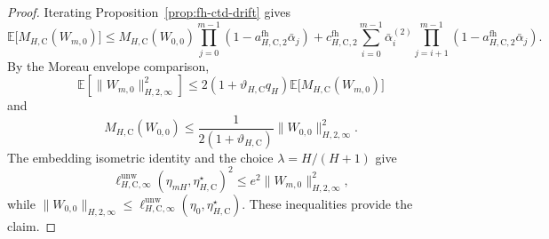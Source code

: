 \documentclass{article}
\newcommand{\E}{\mathbb{E}}
\begin{document}
\begin{proof}
Iterating Proposition~\ref{prop:fh-ctd-drift} gives
\begin{equation}
\E\bigl[M_{H, \mathrm C}(W_{m, 0}) \bigr] \le M_{H, \mathrm C}(W_{0, 0}) \prod_{j=0}^{m-1}(1- a^{\mathrm{fh}}_{H, \mathrm C,2}\bar\alpha_j) + c^{\mathrm{fh}}_{H, \mathrm C,2}\sum_{i=0}^{m-1}\bar\alpha^{(2)}_i \prod_{j=i+1}^{m-1}(1- a^{\mathrm{fh}}_{H, \mathrm C,2} \bar\alpha_j).
\end{equation}
By the Moreau envelope comparison,
\begin{equation}
\E[\lVert W_{m, 0}\rVert^2_{H, 2, \infty}] \le 2(1+\vartheta_{H, \mathrm C}q_H)\E\bigl[ M_{H, \mathrm C}(W_{m, 0})\bigr]
\end{equation}
and
\begin{equation}
M_{H, \mathrm C}(W_{0, 0}) \le \frac{1}{2(1+\vartheta_{H, \mathrm C})}\lVert W_{0, 0}\rVert^2_{H, 2, \infty}.
\end{equation}
The embedding isometric identity and the choice $\lambda=H/(H+1)$ give
\begin{equation}
\ell_{H,\mathrm C,\infty}^{\mathrm{unw}}(\eta_{mH},\eta_{H,\mathrm C}^\star)^2\le e^2\lVert W_{m,0}\rVert_{H,2,\infty}^2,
\end{equation}
while $\lVert W_{0,0}\rVert_{H,2,\infty}\le\ell_{H,\mathrm C,\infty}^{\mathrm{unw}}(\eta_0,\eta_{H,\mathrm C}^\star)$. These inequalities provide the claim.
\end{proof}
\end{document}
